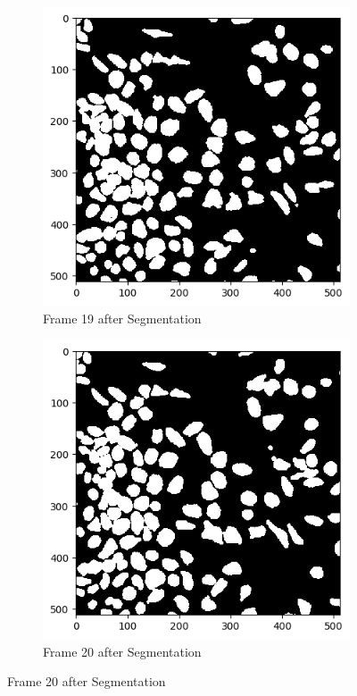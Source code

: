 \documentclass{article}
\begin{document}
\begin{figure}[h!]
  \centering
  \begin{subfigure}{0.4\textwidth}
    \includegraphics[width=\linewidth]{Report/Appendix_Images/Segmentation-A-Control/frame_19.png}
    \caption*{Frame 19 after Segmentation}
  \end{subfigure}
  \hfill
  \begin{subfigure}{0.4\textwidth}
    \includegraphics[width=\linewidth]{Report/Appendix_Images/Segmentation-A-Control/frame_20.png}
    \caption*{Frame 20 after Segmentation}
  \end{subfigure}


\end{figure}
\end{document}

